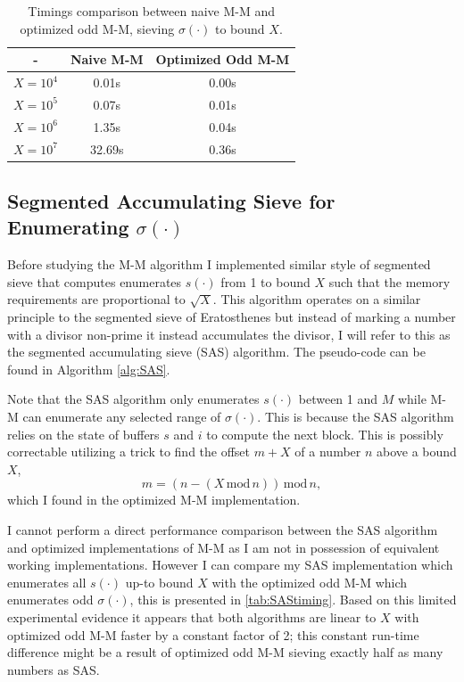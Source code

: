\documentclass{article}
\theoremstyle{definition}
\begin{document}
\begin{table}[H]
    \centering
    \begin{tabular}{| c | c | c |}
        \hline
        -   &   Naive M-M     &   Optimized Odd M-M \\ 
        \hline
        $X = 10^4$  &   0.01s    &  0.00s  \\
        $X = 10^5$  &   0.07s    &  0.01s  \\
        $X = 10^6$  &   1.35s    &  0.04s  \\
        $X = 10^7$  &   32.69s    & 0.36s  \\
        \hline
    \end{tabular}
    \caption{Timings comparison between naive M-M and optimized odd M-M, sieving $\sigma(\cdot)$ to bound $X$.}
    \label{tab:M-Mtiming}
\end{table}

\subsection{Segmented Accumulating Sieve for Enumerating $\sigma(\cdot)$}
Before studying the M-M algorithm I implemented similar style of segmented sieve that computes enumerates $s(\cdot)$ from 1 to bound $X$ such that the memory requirements are proportional to $\sqrt{X}$. This algorithm operates on a similar principle to the segmented sieve of Eratosthenes but instead of marking a number with a divisor non-prime it instead accumulates the divisor, I will refer to this as the segmented accumulating sieve (SAS) algorithm. The pseudo-code can be found in Algorithm \autoref{alg:SAS}.

Note that the SAS algorithm only enumerates $s(\cdot)$ between 1 and $M$ while M-M can enumerate any selected range of $\sigma(\cdot)$. This is because the SAS algorithm relies on the state of buffers $s$ and $i$ to compute the next block. This is possibly correctable utilizing a trick to find the offset $m + X$ of a number $n$ above a bound $X$, $$m = (n - (X \,\text{mod}\, n)) \,\text{mod}\, n,$$ which I found in the optimized M-M implementation.

I cannot perform a direct performance comparison between the SAS algorithm and optimized implementations of M-M as I am not in possession of equivalent working implementations. However I can compare my SAS implementation which enumerates all $s(\cdot)$ up-to bound $X$ with the optimized odd M-M which enumerates odd $\sigma(\cdot)$, this is presented in \autoref{tab:SAStiming}. Based on this limited experimental evidence it appears that both algorithms are linear to $X$ with optimized odd M-M faster by a constant factor of 2; this constant run-time difference might be a result of optimized odd M-M sieving exactly half as many numbers as SAS.
\end{document}
